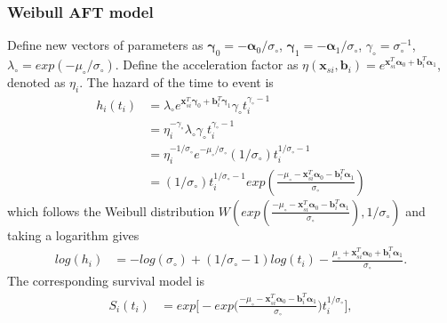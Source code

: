 \subsubsection*{Weibull AFT model}

Define new vectors of parameters as $\boldsymbol{\gamma}_0 = - \boldsymbol{\alpha}_0 / \sigma_{\circ}$, $\boldsymbol{\gamma}_1 = - \boldsymbol{\alpha}_1/ \sigma_{\circ}$, $\gamma_{\circ} = \sigma_{\circ}^{-1}$, $\lambda_{\circ} = exp(-\mu_{\circ} / \sigma_{\circ})$.
Define the acceleration factor as $\eta(\boldsymbol{x}_{si},\boldsymbol{b}_i) = e^{\boldsymbol{x}_{si}^T \boldsymbol{\alpha}_0 + \boldsymbol{b}_i^T  \boldsymbol{\alpha}_1} $, denoted as $\eta_i$. The hazard of the time to event is
\begin{equation}
    \begin{split}
        h_i(t_i) &= \lambda_{\circ} e^{\boldsymbol{x}_{si}^T \boldsymbol{\gamma}_0 + \boldsymbol{b}_i^T  \boldsymbol{\gamma}_1}  \gamma_{\circ} t_i^{\gamma_{\circ}-1} \\
        &= \eta_i^{-\gamma_{\circ}} \lambda_{\circ}\gamma_{\circ}  t_i^{\gamma_{\circ}-1}\\
        &= \eta_i^{-1/\sigma_{\circ}} e^{-\mu_{\circ} / \sigma_{\circ}} (1/\sigma_{\circ}) t_i^{1/\sigma_{\circ} - 1} \\
        &= (1/\sigma_{\circ}) t_i^{1/\sigma_{\circ} - 1}  exp(\frac{-\mu_{\circ} -\boldsymbol{x}_{si}^T \boldsymbol{\alpha}_0 - \boldsymbol{b}_i^T \boldsymbol{\alpha}_1}{\sigma_{\circ}})
    \end{split}
\end{equation}
which follows the Weibull distribution $W(exp(\frac{-\mu_{\circ} -\boldsymbol{x}_{si}^T \boldsymbol{\alpha}_0 - \boldsymbol{b}_i^T \boldsymbol{\alpha}_1}{\sigma_{\circ}}), 1/\sigma_{\circ})$ and taking a logarithm gives
\begin{equation}
    \begin{split}
        log(h_i) &= -log(\sigma_{\circ}) + (1/\sigma_{\circ}-1)log(t_i)- \frac{\mu_{\circ}+\boldsymbol{x}_{si}^T \boldsymbol{\alpha}_0 + \boldsymbol{b}_i^T \boldsymbol{\alpha}_1}{\sigma_{\circ}}.
    \end{split}
\end{equation}
The corresponding survival model is 
\begin{equation}
    \begin{split}
        S_i(t_i) &= exp \Bigg[-exp \Big(\frac{-\mu_{\circ} - \boldsymbol{x}_{si}^T \boldsymbol{\alpha}_0 - \boldsymbol{b}_i^T  \boldsymbol{\alpha}_1}{\sigma_{\circ}} \Big)  t_i^{1/\sigma_{\circ}} \Bigg],
    \end{split}
\end{equation}
